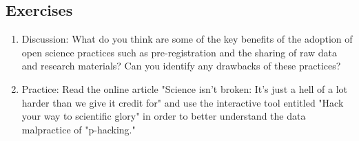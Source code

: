 \subsection{Exercises}
\begin{fullwidth}
\begin{enumerate}
\item Discussion: What do you think are some of the key benefits of the adoption of open science practices such as pre-registration and the sharing of raw data and research materials? Can you identify any drawbacks of these practices?

\item Practice: Read the online article "Science isn't broken: It's just a hell of a lot harder than we give it credit for" and use the interactive tool entitled "Hack your way to scientific glory" in order to better understand the data malpractice of "p-hacking."
\end{enumerate}
\end{fullwidth}
